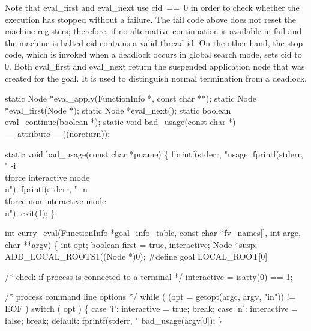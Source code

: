 Note that {\Tt{}eval{\_}first\nwendquote} and {\Tt{}eval{\_}next\nwendquote} use {\Tt{}cid\ ==\ 0\nwendquote} in order
to check whether the execution has stopped without a failure. The
{\Tt{}fail\nwendquote} code above does not reset the machine registers; therefore,
if no alternative continuation is available in {\Tt{}fail\nwendquote} and the
machine is halted {\Tt{}cid\nwendquote} contains a valid thread id. On the other
hand, the {\Tt{}stop\nwendquote} code, which is invoked when a deadlock occurs in
global search mode, sets {\Tt{}cid\nwendquote} to {\Tt{}0\nwendquote}. Both {\Tt{}eval{\_}first\nwendquote} and
{\Tt{}eval{\_}next\nwendquote} return the suspended application node that was created
for the goal. It is used to distinguish normal termination from a
deadlock.

\nwenddocs{}\plusendmoddef\nwstartdeflinemarkup{}\nwenddeflinemarkup
static Node    *eval_apply(FunctionInfo *, const char **);
static Node    *eval_first(Node *);
static Node    *eval_next();
static boolean eval_continue(boolean *);
static void    bad_usage(const char *) __attribute__((noreturn));

static void
bad_usage(const char *pname)
\{
    fprintf(stderr, "usage: %
    fprintf(stderr, " -i\\tforce interactive mode\\n");
    fprintf(stderr, " -n\\tforce non-interactive mode\\n");
    exit(1);
\}

int
curry_eval(FunctionInfo *goal_info_table, const char *fv_names[],
           int argc, char **argv)
\{
    int     opt;
    boolean first = true, interactive;
    Node    *susp;
    ADD_LOCAL_ROOTS1((Node *)0);
#define goal LOCAL_ROOT[0]

    /* check if process is connected to a terminal */
    interactive = isatty(0) == 1;

    /* process command line options */
    while ( (opt = getopt(argc, argv, "in")) != EOF )
        switch ( opt )
        \{
        case 'i':
            interactive = true;
            break;
        case 'n':
            interactive = false;
            break;
        default:
            fprintf(stderr, "%
            bad_usage(argv[0]);
        \}

